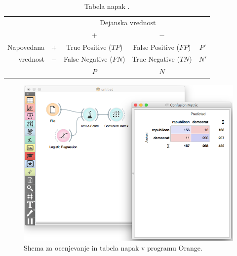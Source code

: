 \begin{table}[htbp]
\caption{Tabela napak .}
\label{t:confusion-matrix}
\begin{center}
\begin{tabular}{rcccc}
& & \multicolumn{2}{c}{Dejanska vrednost} \\ 
& & $+$ & $-$ \\
\cmidrule(r){3-4}
Napovedana & $+$ & True Positive ($TP$) & False Positive ($FP$) & $P'$ \\
vrednost & $-$ & False Negative ($FN$) & True Negative ($TN$) & $N'$ \\ \cmidrule(r){3-4}
& & $P$ & $N$ \\
\end{tabular}
\end{center}
\end{table}

\begin{figure}[htbp]
\begin{center}
\includegraphics[width=12cm]{slike/tabela-napak-orange.png}
\caption{Shema za ocenjevanje in tabela napak v programu Orange.}
\label{f:confusion-matrix}
\end{center}
\end{figure}


